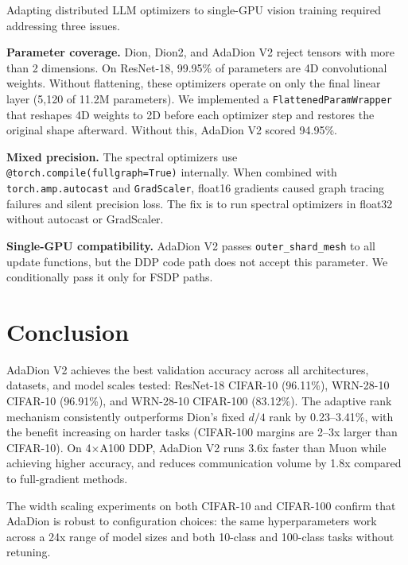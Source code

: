 \documentclass[10pt,twocolumn]{article}
\begin{document}
Adapting distributed LLM optimizers to single-GPU vision training required addressing three issues.

\textbf{Parameter coverage.}
Dion, Dion2, and AdaDion V2 reject tensors with more than 2 dimensions. On ResNet-18, 99.95\% of parameters are 4D convolutional weights. Without flattening, these optimizers operate on only the final linear layer (5,120 of 11.2M parameters). We implemented a \texttt{FlattenedParamWrapper} that reshapes 4D weights to 2D before each optimizer step and restores the original shape afterward. Without this, AdaDion V2 scored 94.95\%.

\textbf{Mixed precision.}
The spectral optimizers use \texttt{@torch.compile(fullgraph=True)} internally. When combined with \texttt{torch.amp.autocast} and \texttt{GradScaler}, float16 gradients caused graph tracing failures and silent precision loss. The fix is to run spectral optimizers in float32 without autocast or GradScaler.

\textbf{Single-GPU compatibility.}
AdaDion V2 passes \texttt{outer\_shard\_mesh} to all update functions, but the DDP code path does not accept this parameter. We conditionally pass it only for FSDP paths.

\section{Conclusion}

AdaDion V2 achieves the best validation accuracy across all architectures, datasets, and model scales tested: ResNet-18 CIFAR-10 (96.11\%), WRN-28-10 CIFAR-10 (96.91\%), and WRN-28-10 CIFAR-100 (83.12\%). The adaptive rank mechanism consistently outperforms Dion's fixed $d/4$ rank by 0.23--3.41\%, with the benefit increasing on harder tasks (CIFAR-100 margins are 2--3x larger than CIFAR-10). On 4$\times$A100 DDP, AdaDion V2 runs 3.6x faster than Muon while achieving higher accuracy, and reduces communication volume by 1.8x compared to full-gradient methods.

The width scaling experiments on both CIFAR-10 and CIFAR-100 confirm that AdaDion is robust to configuration choices: the same hyperparameters work across a 24x range of model sizes and both 10-class and 100-class tasks without retuning.



\end{document}
